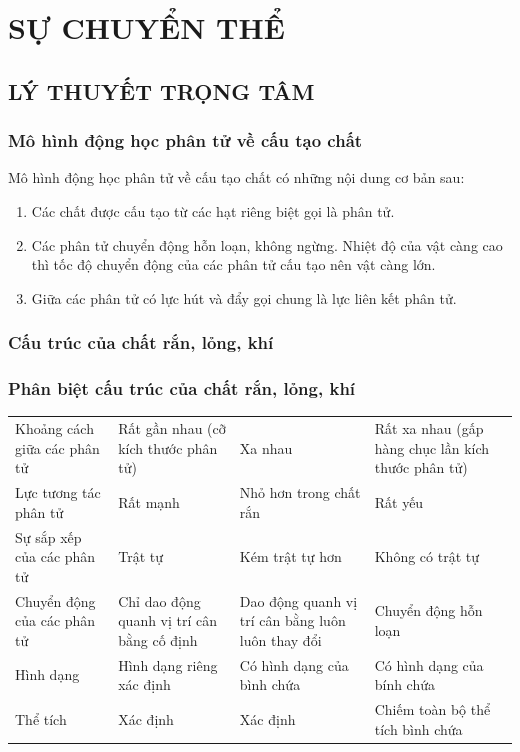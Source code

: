 \setcounter{section}{0}
\section{SỰ CHUYỂN THỂ}
\subsection{LÝ THUYẾT TRỌNG TÂM}
\subsubsection{Mô hình động học phân tử về cấu tạo chất}
Mô hình động học phân tử về cấu tạo chất có những nội dung cơ bản sau:
\begin{enumerate}[label=\arabic*.]
	\item Các chất được cấu tạo từ các hạt riêng biệt gọi là phân tử.
	\item Các phân tử chuyển động hỗn loạn, không ngừng. Nhiệt độ của vật càng cao thì tốc độ chuyển động của các phân tử cấu tạo nên vật càng lớn.
	\item Giữa các phân tử có lực hút và đẩy gọi chung là lực liên kết phân tử.
\end{enumerate}
\subsubsection{Cấu trúc của chất rắn, lỏng, khí}
\subsubsection{Phân biệt cấu trúc của chất rắn, lỏng, khí}
\begin{center}
	\begin{tabular}{|p{4cm}|p{4cm}|p{4cm}|p{4cm}|}
		\hline
		\rowcolor{\nenVD}
		\thead{Đặc điểm}&\thead{Thể rắn} &\thead{Thể lỏng}&\thead{Thể khí}\\
		\hline
		Khoảng cách giữa các phân tử & Rất gần nhau (cỡ kích thước phân tử) & Xa nhau & Rất xa nhau (gấp hàng chục lần kích thước phân tử)\\
		\hline
		Lực tương tác phân tử & Rất mạnh & Nhỏ hơn trong chất rắn & Rất yếu\\
		\hline
		Sự sắp xếp của các phân tử & Trật tự & Kém trật tự hơn & Không có trật tự\\
		\hline
		Chuyển động của các phân tử & Chỉ dao động quanh vị trí cân bằng cố định & Dao động quanh vị trí cân bằng luôn luôn thay đổi & Chuyển động hỗn loạn \\
		\hline
		Hình dạng & Hình dạng riêng xác định & Có hình dạng của bình chứa & Có hình dạng của bính chứa\\
		\hline
		Thể tích & Xác định & Xác định & Chiếm toàn bộ thể tích bình chứa\\
		\hline
	\end{tabular}
\end{center}
